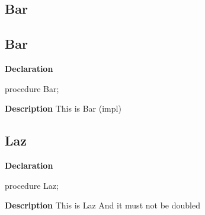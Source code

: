 \documentclass{report}
\newif\ifpdf
\begin{document}
\subsection*{\large{\textbf{Bar}}\normalsize\hspace{1ex}\hrulefill}
\else
\subsection*{Bar}
\fi
\label{ok_parse_impl-Bar}
\begin{list}{}{
\setlength{\itemindent}{0cm}
\setlength{\listparindent}{0cm}
\setlength{\leftmargin}{\evensidemargin}
\addtolength{\leftmargin}{\tmplength}
\settowidth{\labelsep}{X}
\addtolength{\leftmargin}{\labelsep}
\setlength{\labelwidth}{\tmplength}
}
\item[\textbf{Declaration}\hfill]
\ifpdf
\begin{flushleft}
\fi
\begin{ttfamily}
procedure Bar;\end{ttfamily}

\ifpdf
\end{flushleft}
\fi

\par
\item[\textbf{Description}]
This is Bar (impl)

\end{list}
\ifpdf
\subsection*{\large{\textbf{Laz}}\normalsize\hspace{1ex}\hrulefill}
\else
\subsection*{Laz}
\fi
\label{ok_parse_impl-Laz}
\begin{list}{}{
\setlength{\itemindent}{0cm}
\setlength{\listparindent}{0cm}
\setlength{\leftmargin}{\evensidemargin}
\addtolength{\leftmargin}{\tmplength}
\settowidth{\labelsep}{X}
\addtolength{\leftmargin}{\labelsep}
\setlength{\labelwidth}{\tmplength}
}
\item[\textbf{Declaration}\hfill]
\ifpdf
\begin{flushleft}
\fi
\begin{ttfamily}
procedure Laz;\end{ttfamily}

\ifpdf
\end{flushleft}
\fi

\par
\item[\textbf{Description}]
This is Laz And it must not be doubled

\end{list}
\ifpdf
\end{document}
